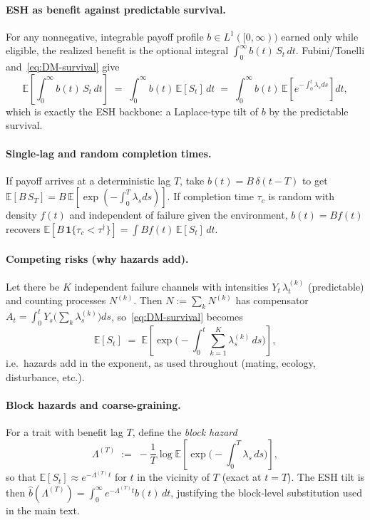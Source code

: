 \documentclass[11pt]{article}
\theoremstyle{upright}
\newcommand{\E}{\mathbb{E}}
\newcommand{\hazT}[1]{\Lambda^{(#1)}}          %
\begin{document}
\paragraph{ESH as benefit against predictable survival.}
For any nonnegative, integrable payoff profile $b\in L^1([0,\infty))$ earned only while eligible,
the realized benefit is the optional integral $\int_0^\infty b(t)\,S_t\,dt$.
Fubini/Tonelli and~\eqref{eq:DM-survival} give
\[
\E\!\left[\int_0^\infty b(t)\,S_t\,dt\right] \;=\; \int_0^\infty b(t)\,\E[S_t]\,dt
\;=\; \int_0^\infty b(t)\,\E\!\left[e^{-\int_0^t \lambda_s ds}\right] dt,
\]
which is exactly the ESH backbone: a Laplace‑type tilt of $b$ by the predictable survival.

\paragraph{Single‑lag and random completion times.}
If payoff arrives at a deterministic lag $T$, take $b(t)=B\,\delta(t-T)$ to get
$\E[B\,S_T]=B\,\E[\exp(-\int_0^{T}\lambda_s ds)]$.
If completion time $\tau_c$ is random with density $f(t)$ and independent of failure given the environment,
$b(t)=B f(t)$ recovers $\E[B\,\mathbf 1\{\tau_c<\tau^\dagger\}]=\int B f(t)\,\E[S_t]\,dt$.

\paragraph{Competing risks (why hazards add).}
Let there be $K$ independent failure channels with intensities $Y_t\,\lambda_t^{(k)}$ (predictable) and
counting processes $N^{(k)}$. Then $N:=\sum_k N^{(k)}$ has compensator
$A_t=\int_0^t Y_s\big(\sum_k \lambda_s^{(k)}\big)ds$, so~\eqref{eq:DM-survival} becomes
\[
\E[S_t] \;=\; \E\!\left[\exp\!\Big(-\int_0^t \sum_{k=1}^K \lambda_s^{(k)}\,ds\Big)\right],
\]
i.e.\ hazards add in the exponent, as used throughout (mating, ecology, disturbance, etc.).

\paragraph{Block hazards and coarse-graining.}
For a trait with benefit lag $T$, define the \emph{block hazard}
\[
\hazT{T} \;:=\; -\frac{1}{T}\log \E\!\left[\exp\!\Big(-\int_0^T \lambda_s\,ds\Big)\right],
\]
so that $\E[S_t]\approx e^{-\hazT{T} t}$ for $t$ in the vicinity of $T$ (exact at $t=T$).
The ESH tilt is then $\widehat b(\hazT{T})=\int_0^\infty e^{-\hazT{T} t}b(t)\,dt$,
justifying the block‑level substitution used in the main text.
\end{document}

